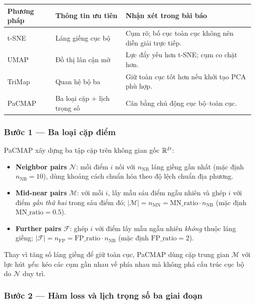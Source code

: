 \begin{center}
\renewcommand{\arraystretch}{1.3}
\begin{tabular}{@{}lll@{}}
\toprule
\textbf{Phương pháp} & \textbf{Thông tin ưu tiên} & \textbf{Nhận xét trong bài báo} \\
\midrule
t-SNE  & Láng giềng cục bộ & Cụm rõ; bố cục toàn cục không nên diễn giải trực tiếp. \\[2pt]
UMAP   & Đồ thị lân cận mờ & Lực đẩy yếu hơn t-SNE; cụm co chặt hơn. \\[2pt]
TriMap & Quan hệ bộ ba & Giữ toàn cục tốt hơn nếu khởi tạo PCA phù hợp. \\[2pt]
PaCMAP & Ba loại cặp + lịch trọng số & Cân bằng chủ động cục bộ--toàn cục. \\
\bottomrule
\end{tabular}
\end{center}

\subsubsection{Bước 1 --- Ba loại cặp điểm}
\label{sec:pacmap-pairs}

PaCMAP xây dựng ba tập cặp trên không gian gốc $\mathbb{R}^D$:
\begin{itemize}
  \item \textbf{Neighbor pairs} $\mathcal{N}$: mỗi điểm $i$ nối với $n_{\text{NB}}$ láng giềng gần nhất (mặc định $n_{\text{NB}} = 10$), dùng khoảng cách chuẩn hóa theo độ lệch chuẩn địa phương.
  \item \textbf{Mid-near pairs} $\mathcal{M}$: với mỗi $i$, lấy mẫu sáu điểm ngẫu nhiên và ghép $i$ với điểm \emph{gần thứ hai} trong sáu điểm đó; $|\mathcal{M}| = n_{\text{MN}} = \text{MN\_ratio} \cdot n_{\text{NB}}$ (mặc định $\text{MN\_ratio} = 0.5$).
  \item \textbf{Further pairs} $\mathcal{F}$: ghép $i$ với điểm lấy mẫu ngẫu nhiên \emph{không} thuộc láng giềng; $|\mathcal{F}| = n_{\text{FP}} = \text{FP\_ratio} \cdot n_{\text{NB}}$ (mặc định $\text{FP\_ratio} = 2$).
\end{itemize}
Thay vì tăng số láng giềng để giữ toàn cục, PaCMAP dùng cặp trung gian $\mathcal{M}$ với lực hút \emph{yếu}: kéo các cụm gần nhau về phía nhau mà không phá cấu trúc cục bộ do $\mathcal{N}$ duy trì.

\subsubsection{Bước 2 --- Hàm loss và lịch trọng số ba giai đoạn}
\label{sec:pacmap-loss}

